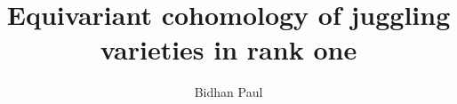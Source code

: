 \documentclass[10pt, a4paper, reqno]{amsart}
\begin{document}
	
	\newcommand{\ch}{{\mathcal H}}
	\newcommand{\cf}{{\mathcal F}}
	\newcommand{\cd}{{\mathcal D}}
	\newcommand{\cR}{{\mathcal R}}
	\newcommand{\cv}{{\mathcal V}}
	\newcommand{\cn}{{\mathcal N}}
	\newcommand{\lra}{\longrightarrow}
	\newcommand{\ra}{\rightarrow}
	\newcommand{\blr}{\Big \longrightarrow}
	\newcommand{\da}{\Big \downarrow}
	\newcommand{\ua}{\Big \uparrow}
	\newcommand{\hra}{\mbox{{$\hookrightarrow$}}}
	\newcommand{\rt}{\mbox{\Large{$\rightarrowtail$}}}
	\newcommand{\dua}{\begin{array}[t]{c}
			\Big\uparrow \\ [-4mm]
			\scriptscriptstyle \wedge \end{array}}
	\newcommand{\ctext}[1]{\makebox(0,0){#1}}
	\setlength{\unitlength}{0.1mm}
	\newcommand{\cl}{{\mathcal L}}
	\newcommand{\cp}{{\mathcal P}}
	\newcommand{\ci}{{\mathcal I}}
	\newcommand{\bz}{\mathbb{Z}}
	\newcommand{\cs}{{\mathcal s}}
	\newcommand{\ce}{{\mathcal E}}
	\newcommand{\ck}{{\mathcal K}}
	\newcommand{\cz}{{\mathcal Z}}
	\newcommand{\cg}{{\mathcal G}}
	\newcommand{\ct}{{\mathcal T}}
	\newcommand{\cj}{{\mathcal J}}
	\newcommand{\cc}{{\mathcal C}}
	\newcommand{\ca}{{\mathcal A}}
	\newcommand{\cb}{{\mathcal B}}
	\newcommand{\cx}{{\mathcal X}}
	\newcommand{\co}{{\mathcal O}}
	\newcommand{\bq}{\mathbb{Q}}
	\newcommand{\bt}{\mathbb{T}}
	\newcommand{\bh}{\mathbb{H}}
	\newcommand{\br}{\mathbb{R}}
	\newcommand{\bl}{\mathbf{L}}
	\newcommand{\wt}{\widetilde}
	\newcommand{\im}{{\rm Im}\,}
	\newcommand{\bc}{\mathbb{C}}
	\newcommand{\bp}{\mathbb{P}}
	\newcommand{\ba}{\mathbb{A}}
	\newcommand{\bn}{\mathbb{N}}
	\newcommand{\spin}{{\rm Spin}\,}
	\newcommand{\ds}{\displaystyle}
	\newcommand{\tor}{{\rm Tor}\,}
	\newcommand{\bff}{{\bf F}}
	\newcommand{\bs}{\mathbb{S}}
	\def\ns{\mathop{\lr}}
	\def\nssup{\mathop{\lr\,sup}}
	\def\nsinf{\mathop{\lr\,inf}}
	\renewcommand{\phi}{\varphi}
	\newcommand{\tT}{{\widetilde{T}}}
	\newcommand{\tG}{{\widetilde{G}}}
	\newcommand{\tB}{{\widetilde{B}}}
	\newcommand{\tC}{{\widetilde{C}}}
	\newcommand{\tW}{{\widetilde{W}}}
	\newcommand{\tphi}{{\widetilde{\Phi}}}
	
	
	

	
	\title{Equivariant cohomology of juggling varieties in rank one}
	\author[Bidhan Paul]{Bidhan Paul}
	\address{School of Mathematical Sciences, Tel Aviv University, Tel Aviv, 69978,
		Israel}
	
	

	
\end{document}
